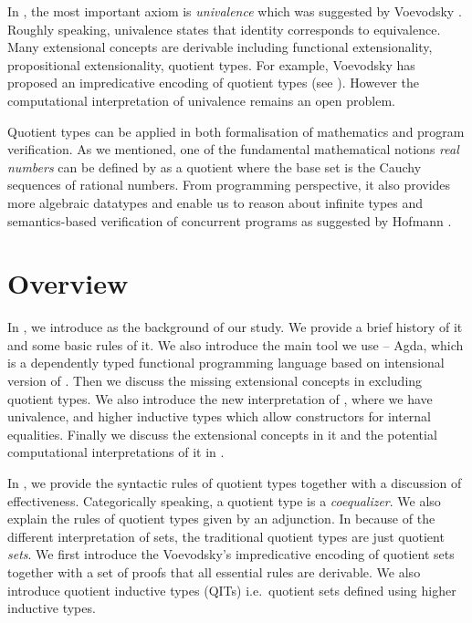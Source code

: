 
In \hott, the most important axiom is \emph{univalence} which was suggested by Voevodsky \cite{VV}. Roughly speaking, univalence states that identity corresponds to equivalence. Many extensional concepts are derivable including functional extensionality, propositional extensionality, quotient types. For example, Voevodsky has proposed an impredicative encoding of quotient types (see ). However the computational interpretation of univalence remains an open problem.


Quotient types can be applied in both formalisation of mathematics and program verification. As we mentioned, one of the fundamental mathematical notions \emph{real numbers} can be defined by as a quotient where the base set is the Cauchy sequences of rational numbers. 
From programming perspective,  it also provides more algebraic
datatypes and enable us to reason about infinite types and
semantics-based verification of concurrent programs as suggested by Hofmann \cite{hof:phd}.


\section{Overview}



In , we introduce \mltt as the background of our study. We provide a brief
history of it and some basic rules of it.
We also introduce the main tool we use -- Agda, which is a dependently typed functional
programming language based on intensional version of \mltt. Then we discuss the missing extensional concepts in \itt excluding quotient types. We also introduce the new interpretation of \hott, where we have univalence, and higher inductive types which allow constructors for internal equalities. Finally we discuss the extensional concepts in it and the potential computational interpretations of it in \itt.


In , we provide the syntactic rules of quotient types together with a discussion of effectiveness. Categorically speaking, a quotient type is a \emph{coequalizer}. We also explain the rules of quotient types given by an adjunction. In \hott because of the different interpretation of sets, the traditional quotient types are just quotient \emph{sets}. We first introduce the Voevodsky's impredicative encoding of quotient sets together with a set of proofs that all essential rules are derivable. We also introduce quotient inductive types (QITs) i.e.\ quotient sets defined using higher inductive types.
 


